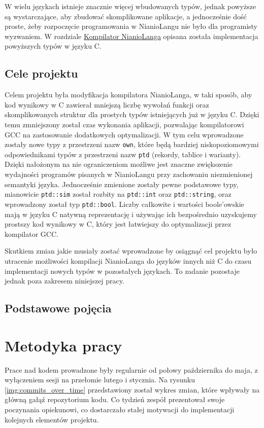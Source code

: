 \documentclass[licencjacka]{pracamgr}
\begin{document}
W wielu językach istnieje znacznie więcej wbudowanych typów, jednak powyższe są wystarczające, aby zbudować skomplikowane aplikacje,
a jednocześnie dość proste, żeby rozpoczęcie programowania w NianioLangu nie było dla programisty wyzwaniem.
W rozdziale \hyperref[sec:compiler]{Kompilator NianioLanga} opisana została implementacja powyższych typów w języku C.

\section{Cele projektu}
Celem projektu była modyfikacja kompilatora NianioLanga, w taki sposób, aby kod wynikowy w C zawierał mniejszą liczbę wywołań funkcji oraz
skomplikowanych
struktur dla prostych typów istniejących już w języku C.
Dzięki temu zmniejszony został czas wykonania aplikacji, pozwalając kompilatorowi GCC na zastosowanie dodatkowych optymalizacji.
W tym celu wprowadzone zostały nowe typy z przestrzeni nazw \texttt{own},
które będą bardziej niskopoziomowymi odpowiednikami typów z przestrzeni nazw \texttt{ptd} (rekordy, tablice i warianty).
Dzięki nałożonym na nie ograniczeniom możliwe jest znaczne zwiększenie wydajności programów pisanych w NianioLangu przy zachowaniu
niezmienionej semantyki języka.
Jednocześnie zmienione zostały pewne podstawowe typy, mianowicie \texttt{ptd::sim} został rozbity na
\texttt{ptd::int} oraz \texttt{ptd::string}, oraz wprowadzony został typ \texttt{ptd::bool}.
Liczby całkowite i wartości boole'owskie mają w języku C natywną reprezentację i używając ich bezpośrednio
uzyskujemy prostszy kod wynikowy w C, który jest łatwiejszy do optymalizacji przez kompilator GCC.

Skutkiem zmian jakie musiały zostać wprowadzone by osiągnąć cel projektu było utracenie możliwości
kompilacji NianioLanga do języków innych niż C do czasu implementacji nowych typów w pozostałych językach.
To zadanie pozostaje jednak poza zakresem niniejszej pracy.

\section{Podstawowe pojęcia}

\chapter{Metodyka pracy}
Prace nad kodem prowadzone były regularnie od połowy października do maja,
z wyłączeniem sesji na przełomie lutego i stycznia. Na rysunku \ref{img:commits_over_time}
przedstawiony został wykres zmian, które wpływały na główną gałąź repozytorium kodu.
Co tydzień zespół prezentował swoje poczynania opiekunowi, co dostarczało stałej motywacji
do implementacji kolejnych elementów projektu.
\end{document}
